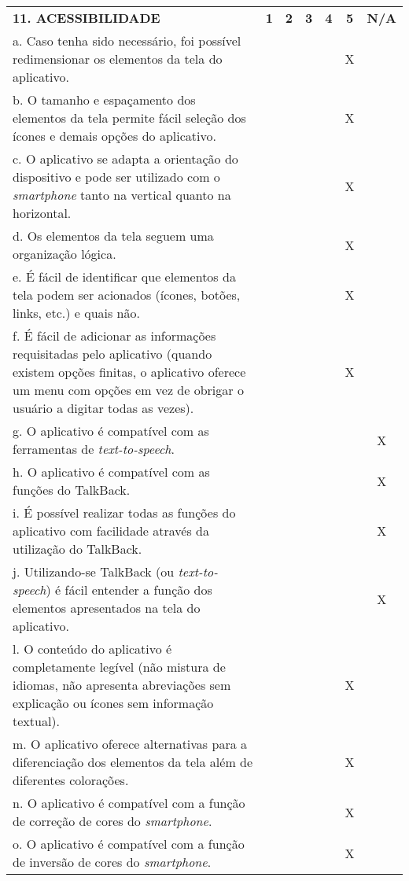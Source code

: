 \documentclass[portuguese,oneside]{tcc}
\begin{document}
\begin{center}
\begin{longtabu}{|L{25em}|c|c|c|c|c|c|}
													\textbf{11. ACESSIBILIDADE} & \textbf{1} & \textbf{2} & \textbf{3} & \textbf{4} & \textbf{5} & \textbf{N/A} \\ 
													a. Caso tenha sido necessário, foi possível redimensionar os elementos da tela do aplicativo. & & & & & X & \\ 
													b. O tamanho e espaçamento dos elementos da tela permite fácil seleção dos ícones e demais opções do aplicativo. & & & & & X & \\ 
													c. O aplicativo se adapta a orientação do dispositivo e pode ser utilizado com o \emph{smartphone} tanto na vertical quanto na horizontal. & & & & & X & \\ 
													d. Os elementos da tela seguem uma organização lógica. & & & & & X & \\ 
													e. É fácil de identificar que elementos da tela podem ser acionados (ícones, botões, links, etc.) e quais não. & & & & & X & \\ 
													f. É fácil de adicionar as informações requisitadas pelo aplicativo (quando existem opções finitas, o aplicativo oferece um menu com opções em vez de obrigar o usuário a digitar todas as vezes). & & & & & X & \\ 
													g. O aplicativo é compatível com as ferramentas de \emph{text-to-speech}. & & & & & & X \\ 
													h. O aplicativo é compatível com as funções do TalkBack. & & & & & & X \\ 
													i. É possível realizar todas as funções do aplicativo com facilidade através da utilização do TalkBack.	& & & & & & X \\ 
													j. Utilizando-se TalkBack (ou \emph{text-to-speech}) é fácil entender a função dos elementos apresentados na tela do aplicativo. & & & & & & X \\ 
													l. O conteúdo do aplicativo é completamente legível (não mistura de idiomas, não apresenta abreviações sem explicação ou ícones sem informação textual). & & & & & X & \\ 
													m. O aplicativo oferece alternativas para a diferenciação dos elementos da tela além de diferentes colorações. & & & & & X & \\ 
													n. O aplicativo é compatível com a função de correção de cores do \emph{smartphone}. & & & & & X & \\ 
													o. O aplicativo é compatível com a função de inversão de cores do \emph{smartphone}. & & & & & X & \\ 
												\end{longtabu}
											\end{center}
											
\end{document}
